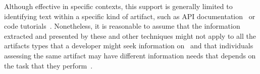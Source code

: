 Although effective in specific contexts, this support is
generally limited to identifying text within a specific kind of
artifact, such as API documentation~\cite{Robillard2015, Xu2017} or
code tutorials~\cite{Jiang2016b, Jiang2017}. 
Nonetheless, it is reasonable to assume
that the information extracted and presented by these and other 
techniques might not apply to all the artifacts types that a developer might seek 
information on~\cite{Liu2019, Brandt2009a}
and that individuals assessing the same artifact may have different
information needs that depends on the task that they perform~\cite{Bavota2016, Walters2014}.






